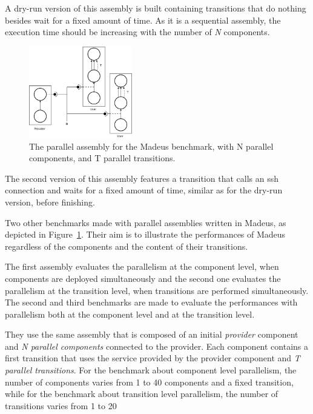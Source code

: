 A dry-run version of this assembly is built containing transitions that do nothing besides wait for a fixed amount of time. As it is a sequential assembly, the execution time should be increasing with the number of \emph{N} components.

\begin{figure}[h]
  \begin{center}
    \includegraphics[width=0.4\textwidth]{./images/par.pdf}
    \caption{The parallel assembly for the Madeus benchmark, with N parallel components, and T parallel transitions.}
    \label{fig:par}
  \end{center}
\end{figure}

The second version of this assembly features a transition that calls an ssh connection and waits for a fixed amount of time, similar as for the dry-run version, before finishing. 

Two other benchmarks made with parallel assemblies written in Madeus, as depicted in Figure~\ref{fig:par}.
Their aim is to illustrate the performances of Madeus regardless of the components and the content of their transitions.

The first assembly evaluates the parallelism at the component level, when components are deployed simultaneously and the second one evaluates the parallelism at the transition level, when transitions are performed simultaneously.
The second and third benchmarks are made to evaluate the performances with parallelism both at the component level and at the transition level.

They use the same assembly that is composed of an initial \emph{provider} component and \emph{N parallel components} connected to the provider. Each component contains a first transition that uses the service provided by the provider component and \emph{T parallel transitions}. For the benchmark about component level parallelism, the number of components varies from 1 to 40 components and a fixed transition, while for the benchmark about transition level parallelism, the number of transitions varies from 1 to 20 %

